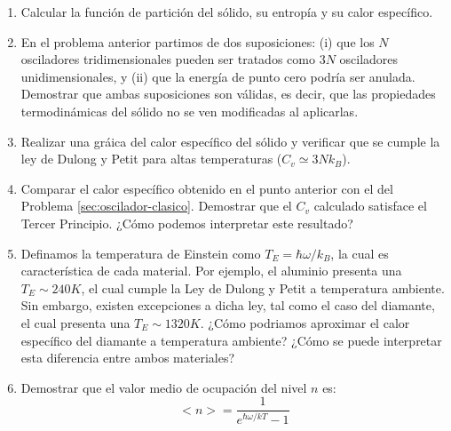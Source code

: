 \documentclass[a4paper,11pt]{article}
\begin{document}
\begin{enumerate}[label=(\alph*),
                  leftmargin=2\parindent,
                  rightmargin=2\parindent]

    \item{Calcular la función de partición del sólido, su entropía y su calor 
          específico.}
    
    \item{En el problema anterior partimos de dos suposiciones:
          (i) que los $N$ osciladores tridimensionales pueden ser 
          tratados como $3N$ osciladores unidimensionales, y
          (ii) que la energía de punto cero podría ser anulada.
          Demostrar que ambas suposiciones son válidas, es decir, que 
          las propiedades termodinámicas del sólido no se ven 
          modificadas al aplicarlas.}
    
    \item{Realizar una gráica del calor específico del sólido y 
          verificar que se cumple la ley de Dulong y Petit para altas 
          temperaturas ($C_v \simeq 3Nk_B$).}

    \item{Comparar el calor específico obtenido en el punto anterior 
          con el del Problema \ref{sec:oscilador-clasico}. Demostrar 
          que el $C_v$ calculado satisface el Tercer Principio. ¿Cómo 
          podemos interpretar este resultado?}
    
    \item{Definamos la temperatura de Einstein como
          $T_E = \hbar \omega / k_B $, la cual es característica de 
          cada material.
          Por ejemplo, el aluminio presenta una $T_E \sim 240 K$, el cual 
          cumple la Ley de Dulong y Petit a temperatura ambiente.
          Sin embargo, existen excepciones a dicha ley, tal como el 
          caso del diamante, el cual presenta una $T_E \sim 1320 K$.
          ¿Cómo podriamos aproximar el calor específico del diamante 
          a temperatura ambiente?
          ¿Cómo se puede interpretar esta diferencia entre ambos 
          materiales?
          }

    \item{Demostrar que el valor medio de ocupación del nivel $n$ es:
          $$<n> = \frac{1}{e^{\hbar \omega / kT} - 1}$$
          }

\end{enumerate}
\end{document}
